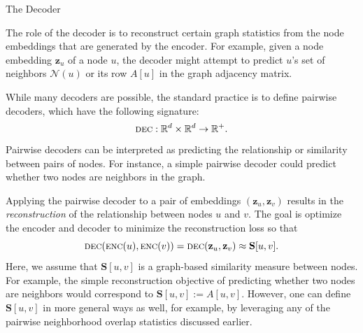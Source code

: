 \documentclass[10pt, aspectratio=169, compress, protectframetitle, handout]{beamer}
\begin{document}
\begin{frame}{The Decoder}

    The role of the \alert{decoder} is to reconstruct certain graph statistics from the node embeddings that are generated by the encoder. For example, given a node embedding $\mathbf z_u$ of a node $u$, the decoder might attempt to predict $u$'s set of neighbors $\mathcal N(u)$ or its row $A[u]$ in the graph adjacency matrix.
    
    While many decoders are possible, the standard practice is to define pairwise decoders, which have the following signature:
    \begin{equation}
        \textsc{dec}: \mathbb R^d \times \mathbb R^d \rightarrow \mathbb R^+.
    \end{equation}
    Pairwise decoders can be interpreted as predicting the relationship or similarity between pairs of nodes. For instance, a simple pairwise decoder could predict whether two nodes are neighbors in the graph.
    
    Applying the pairwise decoder to a pair of embeddings $(\mathbf z_u, \mathbf z_v)$ results in the \emph{reconstruction} of the relationship between nodes $u$ and $v$. The goal is optimize the encoder and decoder to minimize the reconstruction loss so that
    \begin{equation}
        \textsc{dec}(\textsc{enc}(u), \textsc{enc}(v)) = \textsc{dec}(\mathbf z_u, \mathbf z_v) \approx \mathbf S[u, v].
        \label{eq:reconstrloss}
    \end{equation}
    Here, we assume that $\mathbf S[u, v]$ is a graph-based similarity measure between nodes. For example, the simple reconstruction objective of predicting whether two nodes are neighbors would correspond to $\mathbf S[u, v] := A[u, v]$. However, one can define $\mathbf S[u, v]$ in more general ways as well, for example, by leveraging any of the pairwise neighborhood overlap statistics discussed earlier.
        
\end{frame}
\end{document}
